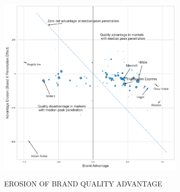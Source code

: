 \documentclass[mksc,blindrev]{informs3} %
\begin{document}
\begin{figure}[hp]
 \caption{EROSION OF BRAND QUALITY ADVANTAGE}
 \centering
  {\includegraphics[width=0.8\textwidth,height=\textheight,keepaspectratio]{./Figures/brand_coeff.png} \label{fig:brandvspenetrate}}
\end{figure}
\clearpage



\ACKNOWLEDGMENT{%
}%


%
%
%



\end{document}

